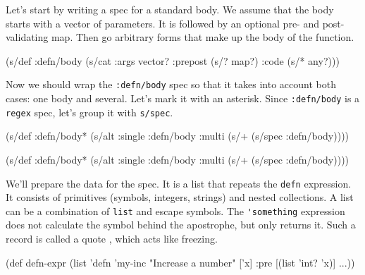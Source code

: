 Let's start by writing a spec for a standard body. We assume that the body starts with a vector of parameters. It is followed by an optional pre- and post-validating map. Then go arbitrary forms that make up the body of the function.

\begin{english}
  \begin{clojure}
(s/def :defn/body
  (s/cat :args vector?
         :prepost (s/? map?)
         :code (s/* any?)))
  \end{clojure}
\end{english}

Now we should wrap the \verb|:defn/body| spec so that it takes into account both cases: one body and several. Let's mark it with an asterisk. Since \verb|:defn/body| is a \verb|regex| spec, let's group it with \verb|s/spec|.

\ifx\DEVICETYPE\MOBILE

\begin{english}
  \begin{clojure}
(s/def :defn/body*
  (s/alt :single :defn/body
         :multi (s/+
                  (s/spec :defn/body))))
  \end{clojure}
\end{english}

\else

\begin{english}
  \begin{clojure}
(s/def :defn/body*
  (s/alt :single :defn/body
         :multi (s/+ (s/spec :defn/body))))
  \end{clojure}
\end{english}

\fi


We'll prepare the data for the spec. It is a list that repeats the \verb|defn| expression. It consists of primitives (symbols, integers, strings) and nested collections. A list can be a combination of \verb|list| and escape symbols. The \verb|'something| expression does not calculate the symbol behind the apostrophe, but only returns it. Such a record is called a quote , which acts like freezing.

\begin{english}
  \begin{clojure}
(def defn-expr
  (list 'defn 'my-inc
        "Increase a number"
        ['x]
        {:pre [(list 'int? 'x)]} ...))
  \end{clojure}
\end{english}

